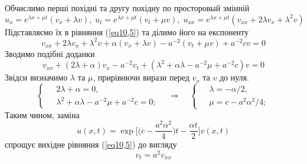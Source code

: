 Обчислимо перші похідні та другу похідну по просторовый змінній
\begin{equation*}
    u_x =  e^{\lambda x + \mu t} (v_x + \lambda v), \; u_t =  e^{\lambda x + \mu t} (v_t + \mu v), \; u_{xx} =  e^{\lambda x + \mu t} (v_{xx} + 2\lambda v_x + \lambda^2 v)
\end{equation*}
Підставляємо їх в рівняння (\ref{eq10,5}) та ділимо його на експоненту
\begin{equation*}
    v_{xx} + 2\lambda v_x + \lambda^2 v + \alpha (v_x + \lambda v) - a^{-2}(v_t + \mu v) + a^{-2}cv = 0
\end{equation*}
Зводимо подібні доданки 
\begin{equation}
    v_{xx} + (2\lambda + \alpha)v_x - a^{-2}v_t + (\lambda^2 + \alpha \lambda - a^{-2}\mu  + a^{-2}c)v = 0
\end{equation}
Звідси визначимо $\lambda$ та $\mu$, прирівнючи вирази перед $v_x$ та $v$ до нуля.
\begin{equation}
    \left\{ \begin{aligned}
        \;& 2\lambda + \alpha = 0,\\
          & \lambda^2 + \alpha \lambda - a^{-2}\mu  + a^{-2}c = 0;
    \end{aligned} \right.
    \quad\Rightarrow\quad
    \left\{ \begin{aligned}
        \;& \lambda = -\alpha/2,\\
          & \mu = c - a^2\alpha^2/4;
    \end{aligned} \right.
\end{equation}
Таким чином, заміна
\begin{equation}
    u(x,t) =  \exp\bigg[\bigg(c - \frac{a^2\alpha^2}{4}\bigg)t - \frac{\alpha t}{2}\bigg] v(x,t)
\end{equation}
спрощує вихідне рівняння (\ref{eq10,5}) до вигляду
\begin{equation}
    v_t = a^2v_{xx}
\end{equation}

%